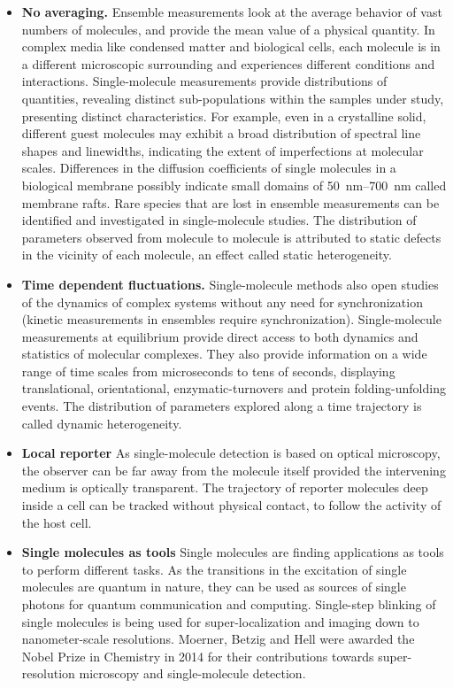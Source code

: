\begin{itemize}
	\item \textbf{No averaging.} Ensemble measurements look at the average behavior of vast numbers of molecules, and provide the mean value of a physical quantity.
	In complex media like condensed matter and biological cells, each molecule is in a different microscopic surrounding and experiences different conditions and interactions.
	Single-molecule measurements provide distributions of quantities, revealing distinct sub-populations within the samples under study, presenting distinct characteristics.
	For example, even in a crystalline solid, different guest molecules may exhibit a broad distribution of spectral line shapes and linewidths, indicating the extent of imperfections at molecular scales.\cite{kozankiewicz1994single,reilly1993spectral}
	Differences in the diffusion coefficients of single molecules in a biological membrane possibly indicate small domains of \SIrange{50}{700}{\nm} called membrane rafts.\cite{lommerse2004singlemolecule}
	Rare species that are lost in ensemble measurements can be identified and investigated in single-molecule studies.
	The distribution of parameters observed from molecule to molecule is attributed to static defects in the vicinity of each molecule, an effect called static heterogeneity.
	\item \textbf{Time dependent fluctuations.} Single-molecule methods also open studies of the dynamics of complex systems without any need for synchronization (kinetic measurements in ensembles require synchronization).
	Single-molecule measurements at equilibrium provide direct access to both dynamics and statistics of molecular complexes.
	They also provide information on a wide range of time scales from microseconds to tens of seconds, displaying translational, orientational, enzymatic-turnovers and protein folding-unfolding events.\cite{schmidt1996imaging,ruiter1997single,lu1998single-molecule,schuler2002probing}
	The distribution of parameters explored along a time trajectory is called dynamic heterogeneity.
	\item \textbf{Local reporter} As single-molecule detection is based on optical microscopy, the observer can be far away from the molecule itself provided the intervening medium is optically transparent. The trajectory of reporter molecules deep inside a cell can be tracked without physical contact, to follow the activity of the host cell.
	\item \textbf{Single molecules as tools} Single molecules are finding applications as tools to perform different tasks. As the transitions in the excitation of single molecules are quantum in nature, they can be used as sources of single photons for quantum communication and computing.\cite{lounis2000single,lounis2005singlephoton}
	Single-step blinking of single molecules is being used for super-localization and imaging down to nanometer-scale resolutions.\cite{park2003superresolution,huang2008threedimensional}
	Moerner, Betzig and Hell were awarded the Nobel Prize in Chemistry in 2014 for their contributions towards super-resolution microscopy and single-molecule detection.
\end{itemize}

